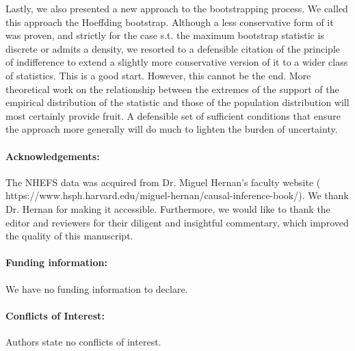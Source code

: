 \documentclass[12pt]{amsart}
\def\supplementfilename{supplement.pdf}
\def\numbersupplementpages{\the\pdflastximagepages}
\newif\ifarXiv
\theoremstyle{plain}%
\theoremstyle{definition}
\theoremstyle{remark}
\numberwithin{equation}{section}
\begin{document}
Lastly, we also presented a new approach to the bootstrapping process. We called this approach the Hoeffding bootstrap. Although a less conservative form of it was proven, and strictly for the case s.t. the maximum bootstrap statistic is discrete or admits a density, we resorted to a defensible citation of the principle of indifference to extend a slightly more conservative version of it to a wider class of statistics. This is a good start. However, this cannot be the end. More theoretical work on the relationship between the extremes of the support of the empirical distribution of the statistic and those of the population distribution will most certainly provide fruit. A defensible set of sufficient conditions that ensure the approach more generally will do much to lighten the burden of uncertainty.
\newline
\paragraph*{\textbf{Acknowledgements}:} The NHEFS data was acquired from Dr. Miguel Hernan's faculty website ( https://www.hsph.harvard.edu/miguel-hernan/causal-inference-book/). We thank Dr. Hernan for making it accessible. Furthermore, we would like to thank the editor and reviewers for their diligent and insightful commentary, which improved the quality of this manuscript.
\newline
\paragraph*{\textbf{Funding information}:} We have no funding information to declare.
\newline\paragraph*{\textbf{Conflicts of Interest}:} Authors state no conflicts of interest. 



\ifarXiv
    \foreach \x in {1,...,\numbersupplementpages}
    {
        
    }
\fi
\end{document}
